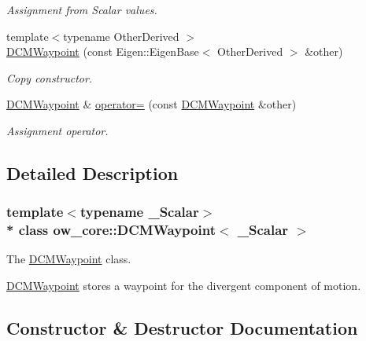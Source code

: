 \begin{DoxyCompactItemize}
\begin{DoxyCompactList}\small\item\em Assignment from Scalar values. \end{DoxyCompactList}\item 
{\footnotesize template$<$typename Other\+Derived $>$ }\\\hyperlink{classow__core_1_1DCMWaypoint_a90bbb0e595856268bac1e3b655e5d4d9}{D\+C\+M\+Waypoint} (const Eigen\+::\+Eigen\+Base$<$ Other\+Derived $>$ \&other)
\begin{DoxyCompactList}\small\item\em Copy constructor. \end{DoxyCompactList}\item 
\hyperlink{classow__core_1_1DCMWaypoint}{D\+C\+M\+Waypoint} \& \hyperlink{classow__core_1_1DCMWaypoint_a93453a6a10ff8f84535917009f155606}{operator=} (const \hyperlink{classow__core_1_1DCMWaypoint}{D\+C\+M\+Waypoint} \&other)\hypertarget{classow__core_1_1DCMWaypoint_a93453a6a10ff8f84535917009f155606}{}\label{classow__core_1_1DCMWaypoint_a93453a6a10ff8f84535917009f155606}

\begin{DoxyCompactList}\small\item\em Assignment operator. \end{DoxyCompactList}\end{DoxyCompactItemize}


\subsection{Detailed Description}
\subsubsection*{template$<$typename \+\_\+\+Scalar$>$\\*
class ow\+\_\+core\+::\+D\+C\+M\+Waypoint$<$ \+\_\+\+Scalar $>$}

The \hyperlink{classow__core_1_1DCMWaypoint}{D\+C\+M\+Waypoint} class. 

\hyperlink{classow__core_1_1DCMWaypoint}{D\+C\+M\+Waypoint} stores a waypoint for the divergent component of motion. 

\subsection{Constructor \& Destructor Documentation}
